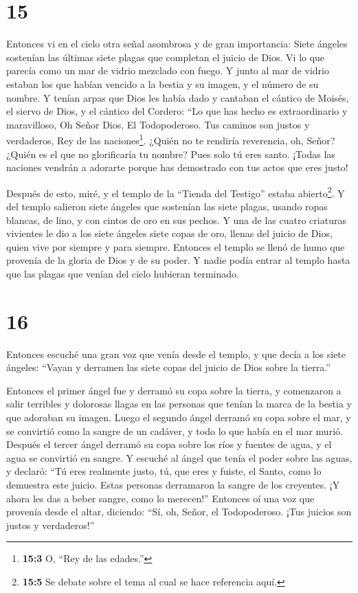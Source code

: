 \hypertarget{section-14}{%
\section{15}\label{section-14}}

 Entonces vi en el cielo otra señal asombrosa y de gran
importancia: Siete ángeles sostenían las últimas siete plagas que
completan el juicio de Dios.  Vi lo que parecía como un mar
de vidrio mezclado con fuego. Y junto al mar de vidrio estaban los que
habían vencido a la bestia y su imagen, y el número de su nombre. Y
tenían arpas que Dios les había dado  y cantaban el cántico
de Moisés, el siervo de Dios, y el cántico del Cordero: ``Lo que has
hecho es extraordinario y maravilloso, Oh Señor Dios, El Todopoderoso.
Tus caminos son justos y verdaderos, Rey de las naciones\footnote{\textbf{15:3}
  O, ``Rey de las edades.''}.  ¿Quién no te rendiría
reverencia, oh, Señor? ¿Quién es el que no glorificaría tu nombre? Pues
solo tú eres santo. ¡Todas las naciones vendrán a adorarte porque has
demostrado con tus actos que eres justo!

 Después de esto, miré, y el templo de la ``Tienda del
Testigo'' estaba abierto\footnote{\textbf{15:5} Se debate sobre el tema
  al cual se hace referencia aquí.}.  Y del templo salieron
siete ángeles que sostenían las siete plagas, usando ropas blancas, de
lino, y con cintos de oro en sus pechos.  Y una de las
cuatro criaturas vivientes le dio a los siete ángeles siete copas de
oro, llenas del juicio de Dios, quien vive por siempre y para siempre.
 Entonces el templo se llenó de humo que provenía de la
gloria de Dios y de su poder. Y nadie podía entrar al templo hasta que
las plagas que venían del cielo hubieran terminado.

\hypertarget{section-15}{%
\section{16}\label{section-15}}

 Entonces escuché una gran voz que venía desde el templo, y
que decía a los siete ángeles: ``Vayan y derramen las siete copas del
juicio de Dios sobre la tierra.''

 Entonces el primer ángel fue y derramó su copa sobre la
tierra, y comenzaron a salir terribles y dolorosas llagas en las
personas que tenían la marca de la bestia y que adoraban su imagen.
 Luego el segundo ángel derramó su copa sobre el mar, y se
convirtió como la sangre de un cadáver, y todo lo que había en el mar
murió.  Después el tercer ángel derramó su copa sobre los
ríos y fuentes de agua, y el agua se convirtió en sangre.  Y
escuché al ángel que tenía el poder sobre las aguas, y declaró: ``Tú
eres realmente justo, tú, que eres y fuiste, el Santo, como lo demuestra
este juicio.  Estas personas derramaron la sangre de los
creyentes. ¡Y ahora les das a beber sangre, como lo merecen!''
 Entonces oí una voz que provenía desde el altar, diciendo:
``Sí, oh, Señor, el Todopoderoso. ¡Tus juicios son justos y
verdaderos!''

